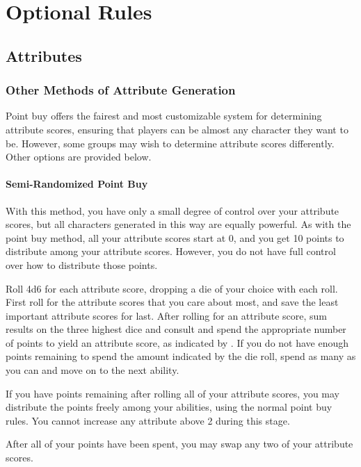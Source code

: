 \chapter{Optional Rules}

\section{Attributes}

    \subsection{Other Methods of Attribute Generation}
        Point buy offers the fairest and most customizable system for determining attribute scores, ensuring that players can be almost any character they want to be. However, some groups may wish to determine attribute scores differently. Other options are provided below.

        \subsubsection{Semi-Randomized Point Buy}
            With this method, you have only a small degree of control over your attribute scores, but all characters generated in this way are equally powerful.
            As with the point buy method, all your attribute scores start at 0, and you get 10 points to distribute among your attribute scores.
            However, you do not have full control over how to distribute those points.

            Roll 4d6 for each attribute score, dropping a die of your choice with each roll. First roll for the attribute scores that you care about most, and save the least important attribute scores for last. After rolling for an attribute score, sum results on the three highest dice and consult  and spend the appropriate number of points to yield an attribute score, as indicated by . If you do not have enough points remaining to spend the amount indicated by the die roll, spend as many as you can and move on to the next ability.

            If you have points remaining after rolling all of your attribute scores, you may distribute the points freely among your abilities, using the normal point buy rules. You cannot increase any attribute above 2 during this stage.

            After all of your points have been spent, you may swap any two of your attribute scores.

